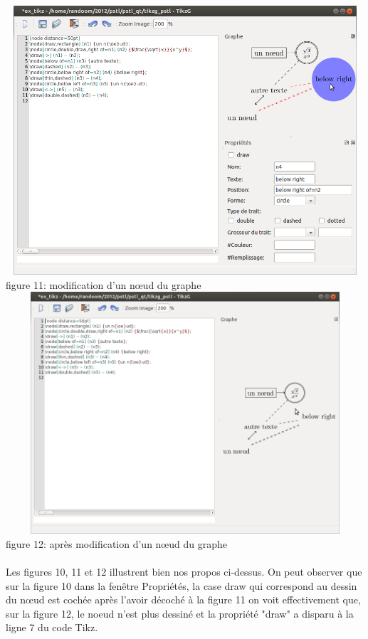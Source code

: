 \documentclass[a4paper]{report}
\begin{document}
  \includegraphics[width=15cm, height=10cm]{img/r_12.png}
\\ 
figure 11: modification d'un n{\oe}ud du graphe
\\
  \includegraphics[width=15cm, height=9cm]{img/r_13.png}
\\ 
figure 12: après modification d'un n{\oe}ud du graphe
\\ \\
Les figures 10, 11 et 12 illustrent bien nos propos ci-dessus. On peut observer que sur la figure 10 dans la fenêtre Propriétés, la case draw qui correspond au dessin du n{\oe}ud est cochée après l'avoir décoché à la figure 11 on voit effectivement que, sur la figure  12, le noeud n'est plus dessiné et la propriété "draw" a disparu à la ligne 7 du code Tikz.
\\ \\ \\ \\ \\
\end{document}
